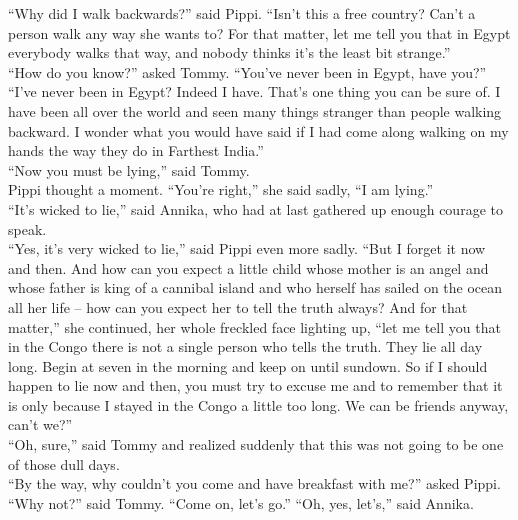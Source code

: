 \documentclass{standard}
\begin{document}
``Why did I walk backwards?” said Pippi. ``Isn’t this a free country? Can’t a person walk any way she wants to? For that matter, let me tell you that in Egypt everybody walks that way, and nobody thinks it’s the least bit strange.”\\

``How do you know?” asked Tommy. ``You’ve never been in Egypt, have you?”\\

``I’ve never been in Egypt? Indeed I have. That’s one thing you can be sure of. I have been all over the world and seen many things stranger than people walking backward. I wonder what you would have said if I had come along walking on my hands the way they do in Farthest India.”\\

``Now you must be lying,” said Tommy.\\

Pippi thought a moment. ``You’re right,” she said sadly, ``I am lying.”\\

``It’s wicked to lie,” said Annika, who had at last gathered up enough courage to speak.\\

``Yes, it’s very wicked to lie,” said Pippi even more sadly. ``But I forget it now and then. And how can you expect a little child whose mother is an angel and whose father is king of a cannibal island and who herself has sailed on the ocean all her life -- how can you expect her to tell the truth always? And for that matter,” she continued, her whole freckled face lighting up, ``let me tell you that in the Congo there is not a single person who tells the truth. They lie all day long. Begin at seven in the morning and keep on until sundown. So if I should happen to lie now and then, you must try to excuse me and to remember that it is only because I stayed in the Congo a little too long. We can be friends anyway, can’t we?”\\

``Oh, sure,” said Tommy and realized suddenly that this was not going to be one of those dull days.\\

``By the way, why couldn’t you come and have breakfast with me?” asked Pippi.\\

``Why not?” said Tommy. ``Come on, let’s go.” ``Oh, yes, let’s,” said Annika.\\
\end{document}
